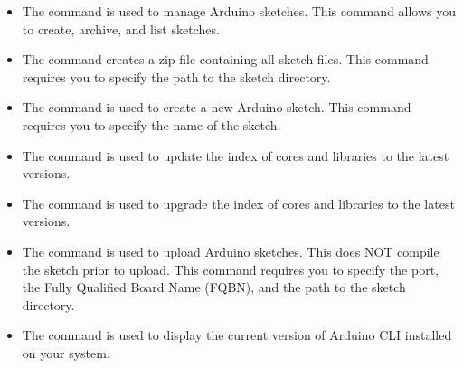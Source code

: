 \begin{itemize}
	
	\item {}
	
	The command  is used to manage Arduino sketches. This command allows you to create, archive, and list sketches.
	
	
	\item {}
	
	The command  creates a zip file containing all sketch files. This command requires you to specify the path to the sketch directory.
	
	
	\item {}
	
	The command  is used to create a new Arduino sketch. This command requires you to specify the name of the sketch.
	
	
	\item {}
	
	The command  is used to update the index of cores and libraries to the latest versions.
	
	
	\item {}
	
	The command  is used to upgrade the index of cores and libraries to the latest versions.
	
	
	\item {}
	
	The command  is used to upload Arduino sketches. This does NOT compile the sketch prior to upload. This command requires you to specify the port, the Fully Qualified Board Name (FQBN), and the path to the sketch directory.
	
	
	\item {}
	
	The command  is used to display the current version of Arduino CLI installed on your system.
	
	
\end{itemize}

